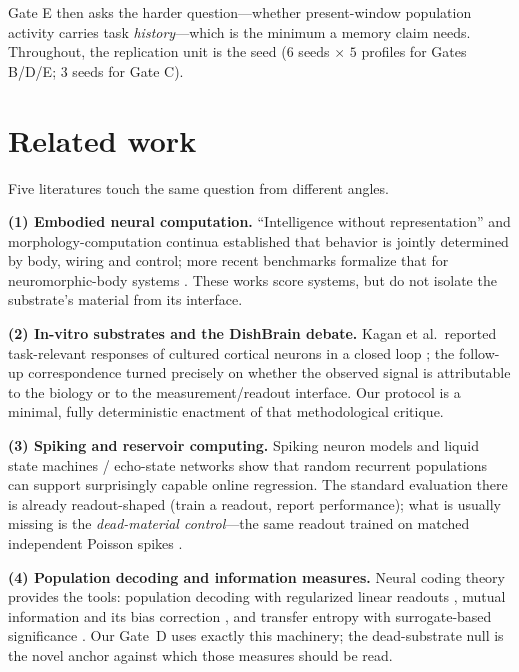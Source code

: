 \documentclass[10pt,a4paper]{article}
\begin{document}
Gate E then asks the harder question---whether present-window population
activity carries task \emph{history}---which is the minimum a memory
claim needs. Throughout, the replication unit is the seed
($6$ seeds $\times$ $5$ profiles for Gates B/D/E; $3$ seeds for Gate C).

\section{Related work}\label{sec:related}

Five literatures touch the same question from different angles.

\textbf{(1) Embodied neural computation.} ``Intelligence without
representation'' \cite{brooks1991} and morphology-computation continua
\cite{pfeifer2006how} established that behavior is jointly determined
by body, wiring and control; more recent benchmarks formalize that for
neuromorphic-body systems \cite{dangelo2026benchmark}. These works
score systems, but do not isolate the substrate's material from its
interface.

\textbf{(2) In-vitro substrates and the DishBrain debate.} Kagan et
al.\ reported task-relevant responses of cultured cortical neurons in a
closed loop \cite{kagan2022dishbrain}; the follow-up correspondence
\cite{balci2023neurons,kagan2023semantics} turned precisely on whether
the observed signal is attributable to the biology or to the
measurement/readout interface. Our protocol is a minimal, fully
deterministic enactment of that methodological critique.

\textbf{(3) Spiking and reservoir computing.} Spiking neuron models
\cite{maass1997,izhikevich2003,izhikevich2004,gerstner2002} and liquid
state machines / echo-state networks \cite{maass2002liquid,
jaeger2001echo,lukosevicius2009} show that random recurrent populations
can support surprisingly capable online regression. The standard
evaluation there is already readout-shaped (train a readout, report
performance); what is usually missing is the \emph{dead-material
control}---the same readout trained on matched independent Poisson
spikes \cite{lukosevicius2009}.

\textbf{(4) Population decoding and information measures.} Neural
coding theory provides the tools: population decoding with regularized
linear readouts \cite{georgopoulos1986,quiroga2009,paninski2004,
hoerl1970}, mutual information and its bias correction
\cite{shannon1948,kraskov2004,panzeri2007}, and transfer entropy with
surrogate-based significance \cite{schreiber2000,walker2018}. Our Gate~D
uses exactly this machinery; the dead-substrate null is the novel
anchor against which those measures should be read.
\end{document}
